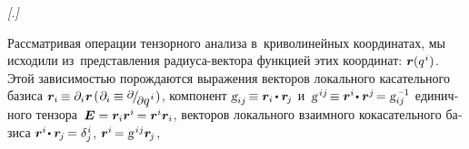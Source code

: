 \begin{otherlanguage}{russian}

\begin{changemargin}{\parindent}{\parindent}
{\small
\noindent \emph{[.]}
\par}
\end{changemargin}

\noindent Рассматривая операции тензорного анализа в~криволинейных координатах, мы исходили из~представления радиуса\hbox{-}вектора функцией этих координат: ${\bm{r}(q^{\hspace{.1ex}i})}$. Этой зависимостью порождаются выражения
векторов локального касательного \hbox{базиса} ${\bm{r}_i \hspace{-0.16ex} \equiv \partial_i \hspace{.12ex} \bm{r}}$\:${( \hspace{.12ex} \partial_i \hspace{-0.1ex} \equiv \smash{\raisemath{0.16em}{\scalebox{0.88}{$\partial$}} \hspace{-0.24ex} / \hspace{-0.32ex} \raisemath{-0.32em}{\scalebox{0.88}{$\partial$} q^{\hspace{.1ex}i}}} \hspace{.16ex} )}$,
компонент ${\textsl{g}_{ij} \hspace{-0.24ex} \equiv \bm{r}_i \hspace{-0.16ex} \dotp \bm{r}_{\hspace{-0.2ex}j}}$ и~${\textsl{g}^{\hspace{.25ex}ij} \hspace{-0.32ex} \equiv \bm{r}^i \hspace{-0.32ex} \dotp \bm{r}^j \hspace{-0.32ex} = \smash{\textsl{g}_{ij}^{\hspace{.4ex}\expminusone}}}$ единичного  тензора~${\bm{E} = \bm{r}_i \bm{r}^i \hspace{-0.2ex} = \bm{r}^i \bm{r}_i}$,
векторов локального взаимного кокасательного \hbox{базиса} ${\bm{r}^i \hspace{-0.32ex} \dotp \bm{r}_{\hspace{-0.2ex}j} \hspace{-0.16ex} = \delta_j^{\hspace{0.1ex}i}}$, ${\bm{r}^i \hspace{-0.25ex} = \textsl{g}^{\hspace{.25ex}ij} \bm{r}_{\hspace{-0.2ex}j}}$,

\end{otherlanguage}

